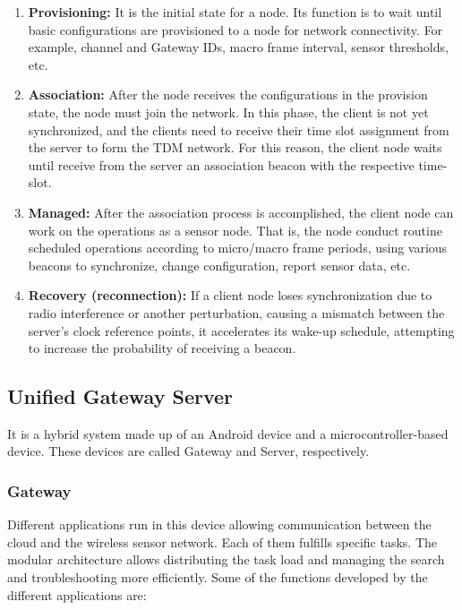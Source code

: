 \documentclass[journal]{IEEEtran}	%
\begin{document}
\begin{enumerate}
\item \textbf{Provisioning:} It is the initial state for a node. Its function is to wait until basic configurations are provisioned to a node for network connectivity. For example, channel and Gateway IDs, macro frame interval, sensor thresholds, etc.
\item \textbf{Association:} After the node receives the configurations in the provision state, the node must join the network. In this phase, the client is not yet synchronized, and the clients need to receive their time slot assignment from the server to form the TDM network. For this reason, the client node waits until receive from the server an association beacon with the respective time-slot.
\item \textbf{Managed:} After the association process is accomplished, the client node can work on the operations as a sensor node. That is, the node conduct routine scheduled operations according to micro/macro frame periods, using various beacons to synchronize, change configuration, report sensor data, etc.
\item \textbf{Recovery (reconnection):} If a client node loses synchronization due to radio interference or another perturbation, causing a mismatch between the server's clock reference points, it accelerates its wake-up schedule, attempting to increase the probability of receiving a beacon.
\end{enumerate}


\subsection{Unified Gateway Server}


It is a hybrid system made up of an Android device and a microcontroller-based device. These devices are called Gateway and Server, respectively.


\subsubsection{Gateway}
\label{sec:gateway}


Different applications run in this device allowing communication between the cloud and the wireless sensor network. Each of them fulfills specific tasks. The modular architecture allows distributing the task load and managing the search and troubleshooting more efficiently. Some of the functions developed by the different applications are:
\end{document}
